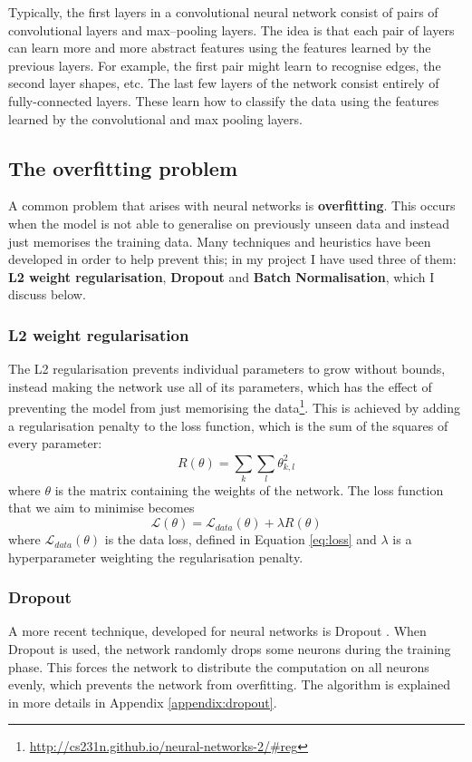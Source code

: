 \documentclass[12pt,a4paper,twoside,openright]{report}
\begin{document}
Typically, the first layers in a convolutional neural network consist of pairs of convolutional layers and max--pooling layers. The idea is that each  pair of layers can learn more and more abstract features using the features learned by the previous layers. For example, the first pair might learn to recognise edges, the second layer shapes, etc. The last few layers of the network consist entirely of fully-connected layers. These learn how to classify the data using the features learned by the convolutional and max pooling layers.

\subsection{The overfitting problem}
A common problem that arises with neural networks is \textbf{overfitting}. This occurs when the model is not able to generalise on previously unseen data and instead just memorises the training data. Many techniques and heuristics have been developed in order to help prevent this; in my project I have used three of them: \textbf{L2 weight regularisation}, \textbf{Dropout} and \textbf{Batch Normalisation}, which I discuss below.

\subsubsection{\textbf{L2} weight regularisation}
The L2 regularisation prevents individual parameters to grow without bounds, instead making the network use all of its parameters, which has the effect of preventing the model from just memorising the data\footnote{\url{http://cs231n.github.io/neural-networks-2/\#reg}}. This is achieved by adding a regularisation penalty to the loss function, which is the sum of the squares of every parameter:
\begin{equation}
	R(\theta) = \sum_{k}^{} \sum_{l}^{} \theta_{k,l}^2
\end{equation} 
where $\theta$ is the matrix containing the weights of the network.
The loss function that we aim to minimise becomes
\begin{equation}
	\mathcal{L}(\theta) = \mathcal{L}_{data}(\theta) + \lambda R(\theta) 
\end{equation}
where $\mathcal{L}_{data}(\theta)$ is the data loss, defined in Equation \ref{eq:loss} and $\lambda$ is a hyperparameter weighting the regularisation penalty. 

\subsubsection{Dropout}
A more recent technique, developed for neural networks is Dropout \cite{dropout}. When Dropout is used, the network randomly drops some neurons during the training phase. This forces the network to distribute the computation on all neurons evenly, which prevents the network from overfitting. The algorithm is explained in more details in Appendix \ref{appendix:dropout}.
\end{document}
